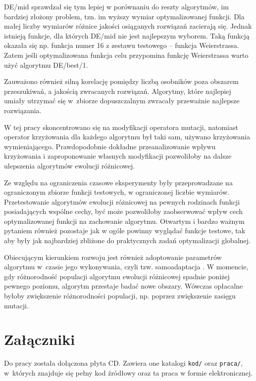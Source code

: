 \documentclass[a4paper,onecolumn,oneside,12pt,wide,floatssmall]{mwrep}
\theoremstyle{definition}
\theoremstyle{plain}%
\theoremstyle{remark}
\begin{document}
DE/mid sprawdzał się tym lepiej w porównaniu do reszty algorytmów, im bardziej
złożony problem, tzn. im wyższy wymiar optymalizowanej funkcji. Dla małej liczby wymiarów
różnice jakości osiąganych rozwiązań zacierają się. Jednak istnieją funkcje, dla których DE/mid nie jest najlepszym wyborem. Taką funkcją okazała się np.
funkcja numer 16 z zestawu testowego -- funkcja Weierstrassa. Zatem jeśli optymalizowana funkcja celu
przypomina funkcję Weierstrassa warto użyć algorytmu DE/best/1.

Zauważono również silną korelację pomiędzy liczbą osobników poza obszarem przeszukiwań,
a jakością zwracanych rozwiązań. Algorytmy, które najlepiej umiały utrzymać się w~zbiorze 
dopuszczalnym zwracały przeważnie najlepsze rozwiązania. 


W tej pracy skoncentrowano się na modyfikacji operatora mutacji, natomiast operator krzyżowania
dla każdego algorytmu był taki sam, używano krzyżowania wymieniającego. Prawdopodobnie dokładne
przeanalizowanie wpływu krzyżowania i zaproponowanie własnych modyfikacji 
pozwoliłoby na dalsze ulepszenia algorytmów ewolucji różnicowej. 

Ze względu na ograniczenia czasowe eksperymenty były przeprowadzane na ograniczonym zbiorze
funkcji testowych, w ograniczonej liczbie wymiarów. Przetestowanie algorytmów ewolucji
różnicowej na pewnych rodzinach funkcji posiadających wspólne cechy, być może pozwoliłoby
zaobserwować wpływ cech optymalizowanej funkcji na zachowanie algorytmu. 
Otwartym i bardzo ważnym pytaniem również pozostaje jak w ogóle powinny wyglądać funkcje testowe, 
tak aby były jak najbardziej zbliżone do praktycznych zadań
optymalizacji globalnej.

Obiecującym kierunkiem rozwoju jest również adoptowanie parametrów algorytmu w~czasie
jego wykonywania, czyli tzw. samoadaptacja \cite{brest}. W momencie, gdy różnorodność populacji
algorytmu ewolucji różnicowej spadnie poniżej pewnego poziomu, algorytm przestaje badać nowe obszary.
Wówczas opłacalne byłoby zwiększenie różnorodności populacji, np. poprzez zwiększenie zasięgu mutacji.

\appendix

\chapter{Załączniki}

Do pracy została dołączona płyta CD. Zawiera one katalogi \texttt{kod/} oraz \texttt{praca/},
w~których znajduje się pełny kod źródłowy oraz ta praca w formie elektronicznej.
\end{document}
